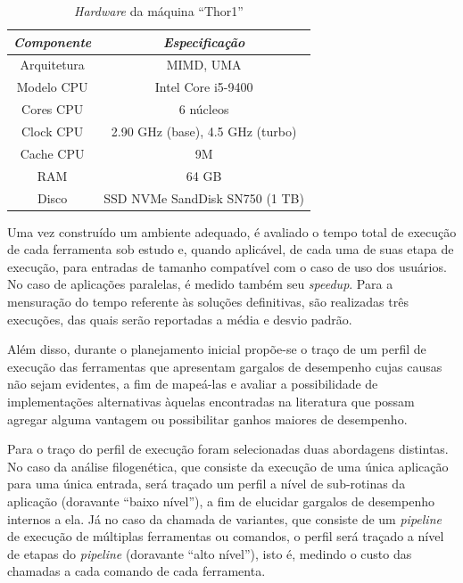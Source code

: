 \documentclass[cic,tc]{iiufrgs}
\begin{document}
\begin{table}[h]
    \caption{\textit{Hardware} da máquina ``Thor1''}
    \centering
        \begin{tabular}{c|c}
          \hline
          \textit{Componente}  &   \textit{Especificação} \\
          \hline
          \hline
          Arquitetura & MIMD, UMA \\
          Modelo CPU & Intel Core i5-9400 \\
          Cores CPU & 6 núcleos\\
          Clock CPU & 2.90 GHz (base), 4.5 GHz (turbo) \\
          Cache CPU & 9M \\
          RAM & 64 GB \\
          Disco & SSD NVMe SandDisk SN750 (1 TB) \\
          \hline
        \end{tabular}
    \label{tbl:thor1}
\end{table}

Uma vez construído um ambiente adequado, é avaliado o tempo total de execução
de cada ferramenta sob estudo e, quando aplicável, de cada uma de suas etapa de
execução, para entradas de tamanho compatível com o caso de uso dos usuários.
No caso de aplicações paralelas, é medido também seu \textit{speedup}. Para a
mensuração do tempo referente às soluções definitivas, são realizadas três
execuções, das quais serão reportadas a média e desvio padrão.

Além disso, durante o planejamento inicial propõe-se o traço de um perfil de
execução das ferramentas que apresentam gargalos de desempenho cujas causas não
sejam evidentes, a fim de mapeá-las e avaliar a possibilidade de implementações
alternativas àquelas encontradas na literatura que possam agregar alguma
vantagem ou possibilitar ganhos maiores de desempenho.

Para o traço do perfil de execução foram selecionadas duas abordagens
distintas. No caso da análise filogenética, que consiste da execução de uma
única aplicação para uma única entrada, será traçado um perfil a nível de
sub-rotinas da aplicação (doravante ``baixo nível''), a fim de elucidar gargalos
de desempenho internos a ela. Já no caso da chamada de variantes, que consiste
de um \textit{pipeline} de execução de múltiplas ferramentas ou comandos, o perfil será
traçado a nível de etapas do \textit{pipeline} (doravante ``alto nível''), isto é,
medindo o custo das chamadas a cada comando de cada ferramenta.
\end{document}
